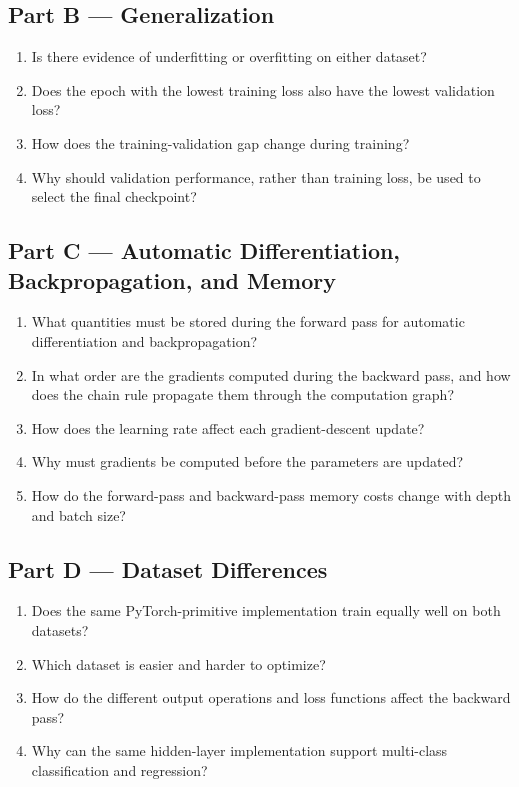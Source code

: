 \documentclass[11pt,a4paper]{article}
\begin{document}
\subsection*{Part B --- Generalization}

\begin{enumerate}
    \item Is there evidence of underfitting or overfitting on either dataset?
    \item Does the epoch with the lowest training loss also have the lowest validation loss?
    \item How does the training-validation gap change during training?
    \item Why should validation performance, rather than training loss, be used to select the final checkpoint?
\end{enumerate}

\subsection*{Part C --- Automatic Differentiation, Backpropagation, and Memory}

\begin{enumerate}
    \item What quantities must be stored during the forward pass for automatic differentiation and backpropagation?
    \item In what order are the gradients computed during the backward pass, and how does the chain rule propagate them through the computation graph?
    \item How does the learning rate affect each gradient-descent update?
    \item Why must gradients be computed before the parameters are updated?
    \item How do the forward-pass and backward-pass memory costs change with depth and batch size?
\end{enumerate}

\subsection*{Part D --- Dataset Differences}

\begin{enumerate}
    \item Does the same PyTorch-primitive implementation train equally well on both datasets?
    \item Which dataset is easier and harder to optimize?
    \item How do the different output operations and loss functions affect the backward pass?
    \item Why can the same hidden-layer implementation support multi-class classification and regression?
\end{enumerate}
\end{document}
